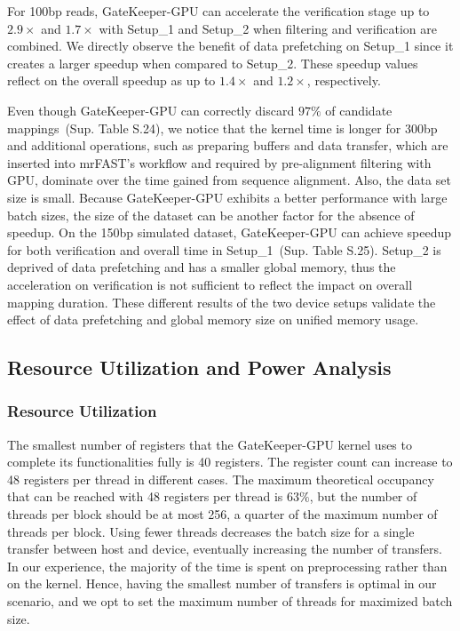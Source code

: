 For 100bp reads, GateKeeper-GPU can accelerate the verification stage up to $2.9\times$ and $1.7\times$ with Setup\_1 and Setup\_2 when filtering and verification are combined. We directly observe the benefit of data prefetching on Setup\_1 since it creates a larger speedup when compared to Setup\_2. These speedup values reflect on the overall speedup as up to $1.4\times$ and $1.2\times$, respectively.

Even though GateKeeper-GPU can correctly discard $97\%$ of candidate mappings~(Sup. Table S.24), we notice that the kernel time is longer for 300bp and additional operations, such as preparing buffers and data transfer, which are inserted into mrFAST's workflow and required by pre-alignment filtering with GPU, dominate over the time gained from sequence alignment. Also, the data set size is small. Because GateKeeper-GPU exhibits a better performance with large batch sizes, the size of the dataset can be another factor for the absence of speedup. On the 150bp simulated dataset, GateKeeper-GPU can achieve speedup for both verification and overall time in Setup\_1~(Sup. Table S.25). Setup\_2 is deprived of data prefetching and has a smaller global memory, thus the acceleration on verification is not sufficient to reflect the impact on overall mapping duration. These different results of the two device setups validate the effect of data prefetching and global memory size on unified memory usage.  

\subsection{Resource Utilization and Power Analysis}

\subsubsection{Resource Utilization}
The smallest number of registers that the GateKeeper-GPU kernel uses to complete its functionalities fully is 40 registers. The register count can increase to 48 registers per thread in different cases. The maximum theoretical occupancy that can be reached with 48 registers per thread is $63\%$, but the number of threads per block should be at most 256, a quarter of the maximum number of threads per block. Using fewer threads decreases the batch size for a single transfer between host and device, eventually increasing the number of transfers. In our experience, the majority of the time is spent on preprocessing rather than on the kernel. Hence, having the smallest number of transfers is optimal in our scenario, and we opt to set the maximum number of threads for maximized batch size. 

